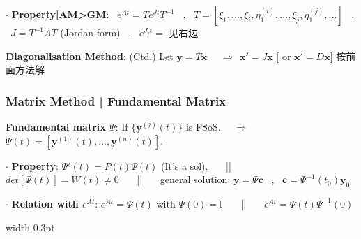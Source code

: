 \documentclass[8pt]{extarticle}
\begin{document}
\begin{minipage}[t]{0.60\textwidth}
    $\cdot$ \textbf{Property|AM>GM}: \ $e^{At}=Te^{Jt}T^{-1}$ \ , \ $T=[\xi_1,...,\xi_i,\eta^{(i)}_1,...,\xi_j,\eta^{(j)}_1,...]$ \ , \ $J=T^{-1}AT$ { (Jordan form)} \ , \ $e^{J_it}=$ 见右边

    \textbf{Diagonalisation Method}: (Ctd.) Let $\mathbf{y}=T\mathbf{x}$ \ \ $\Rightarrow \ \ \mathbf{x}'=J\mathbf{x}$ [{ or} $\mathbf{x}'=D\mathbf{x}$] { 按前面方法解}


    \subsubsection{Matrix Method | Fundamental Matrix}

    \textbf{Fundamental matrix $\Psi$}: If $\{\mathbf{y}^{(j)}(t)\}$ is FSoS. \ \ $\Rightarrow$ \ \ $\Psi(t)=[\mathbf{y}^{(1)}(t),...,\mathbf{y}^{(n)}(t)]$.

    $\cdot$ \textbf{Property}: $\Psi'(t)=P(t)\Psi(t)$ (It's a sol). \ \ \ || \ \ \ $det[\Psi(t)]=W(t)\ne0$ \ \ \ || \ \ \ general solution: $\mathbf{y}=\Psi\mathbf{c}$ \ , \ $\mathbf{c}=\Psi^{-1}(t_0)\mathbf{y}_0$

    $\cdot$ \textbf{Relation with $e^{At}$}: $e^{At}=\Psi(t)$ with $\Psi(0)=\mathbb{I}$ \ \ \ || \ \ \ $e^{At}=\Psi(t)\Psi^{-1}(0)$

\end{minipage}
\hfill
\vrule width 0.3pt
\hfill
\end{document}
